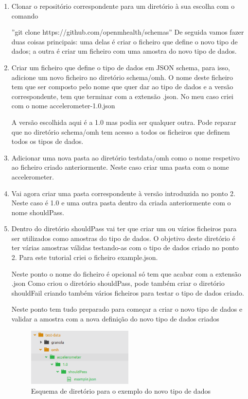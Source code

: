 \begin{enumerate}
  \item Clonar o repositório correspondente para um diretório à sua escolha com o comando \par
  ''git clone https://github.com/openmhealth/schemas'' 
  De seguida vamos fazer duas coisas principais: uma delas é criar o ficheiro que define o novo tipo de dados; a outra é criar um ficheiro com uma amostra do novo tipo de dados.
  \item Criar um ficheiro que define o tipo de dados em \gls{JSON} schema, para isso, adicione um novo ficheiro no diretório schema/omh. O nome deste ficheiro tem que ser composto pelo nome que quer dar ao tipo de dados e a versão correspondente, tem que terminar com a extensão .json. No meu caso criei com o nome accelerometer-1.0.json  \par A versão escolhida aqui é a 1.0 mas podia ser qualquer outra. Pode reparar que no diretório schema/omh tem acesso a todos os ficheiros que definem todos os tipos de dados.
  \item Adicionar uma nova pasta ao diretório testdata/omh como o nome respetivo ao ficheiro criado anteriormente. Neste caso criar uma pasta com o nome accelerometer.
  \item Vai agora criar uma pasta correspondente à versão introduzida no ponto 2. Neste caso é 1.0 e uma outra pasta dentro da criada anteriormente com o nome shouldPass.
  \item Dentro do diretório shouldPass vai ter que criar um ou vários ficheiros para ser utilizados como amostras do tipo de dados. O objetivo deste diretório é ter várias amostras válidas testando-as com o tipo de dados criado no ponto 2. Para este tutorial criei o ficheiro example.json. \par Neste ponto o nome do ficheiro é opcional só tem que acabar com a extensão .json
  Como criou o diretório shouldPass, pode também criar o diretório shouldFail criando também vários ficheiros para testar o tipo de dados criado. \par 
  Neste ponto tem tudo preparado para começar a criar o novo tipo de dados e validar a amostra com a nova definição do novo tipo de dados criados
  
  \begin{figure}[!ht]
  \centering
  \includegraphics[width=0.5\textwidth]{imgs/newsampledata.png}
  \caption[Esquema de diretório para o novo sample]{Esquema de diretório para o exemplo do novo tipo de dados}
  

\end{figure}
\end{enumerate}
